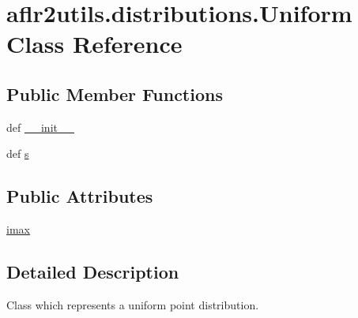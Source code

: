 \hypertarget{classaflr2utils_1_1distributions_1_1Uniform}{\section{aflr2utils.\-distributions.\-Uniform Class Reference}
\label{classaflr2utils_1_1distributions_1_1Uniform}
}
\subsection*{Public Member Functions}
\begin{DoxyCompactItemize}
\item 
def \hyperlink{classaflr2utils_1_1distributions_1_1Uniform_ac158231885d28a9c65cacdfa4aad624b}{\-\_\-\-\_\-init\-\_\-\-\_\-}
\item 
def \hyperlink{classaflr2utils_1_1distributions_1_1Uniform_a4616ede7c9a0ef420dc12836ae91f9dd}{s}
\end{DoxyCompactItemize}
\subsection*{Public Attributes}
\begin{DoxyCompactItemize}
\item 
\hyperlink{classaflr2utils_1_1distributions_1_1Uniform_a52cb53c4527873c5357275d12c76ce5b}{imax}
\end{DoxyCompactItemize}


\subsection{Detailed Description}
\begin{DoxyVerb}Class which represents a uniform point distribution.
\end{DoxyVerb}
 

